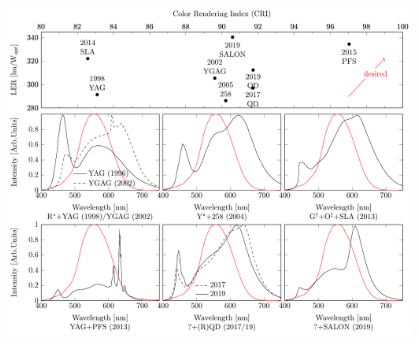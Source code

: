 \documentclass[10pt]{article}
\begin{document}
\begin{figure}[H]
	\centering
    \includegraphics[width=0.95\textwidth]{2_SSL_EES/article/figures/phosphor_spectrum-comparison.pdf}

\end{figure}
\end{document}
